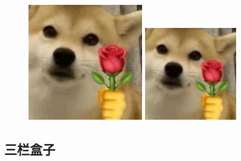 \documentclass{article}   %
\begin{document}
		\begin{figure}[htbp!]
			\begin{minipage}{0.48\linewidth}
				\centering    %
				\includegraphics[height=5cm]{img/sample.png}
			\end{minipage}
			\begin{minipage}{0.48\linewidth}
				\centering
				\includegraphics[height=4cm]{img/sample.png}
			\end{minipage}
		\end{figure}
	
		\subsection{三栏盒子}
		
\end{document}
